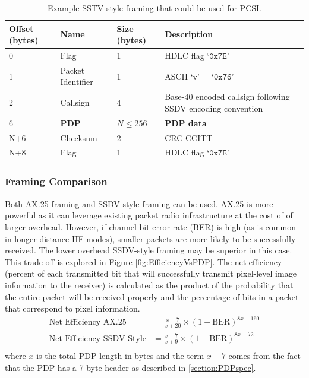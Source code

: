 \documentclass[letterpaper]{article}
\begin{document}
\begin{table}[tbp]
    \centering
\begin{tabularx}{\textwidth}{ |l|l|l|X| } 
 \hline
 \textbf{Offset (bytes)} & \textbf{Name} & \textbf{Size (bytes)} & \textbf{Description} \\ \hline\hline
 0 & Flag & 1 & HDLC flag `$\mathtt{0x7E}$' \\ \hline
 1 & Packet Identifier & 1 & ASCII `v' = `$\mathtt{0x76}$' \\ \hline
 2 & Callsign & 4 & Base-40 encoded callsign following SSDV encoding convention \\ \hline
 6 & \textbf{PDP} & $N \leq 256$ & \textbf{PDP data} \\ \hline
 N+6 & Checksum & 2 & CRC-CCITT\\ \hline
 N+8 & Flag & 1 & HDLC flag `$\mathtt{0x7E}$' \\
 \hline
\end{tabularx}
\caption{Example SSTV-style framing that could be used for PCSI.}
\label{table:SSDVframing}
\end{table}



\subsubsection{Framing Comparison}
Both AX.25 framing and SSDV-style framing can be used. AX.25 is more powerful as it can leverage existing packet radio infrastructure at the cost of of larger overhead. However, if channel bit error rate (BER) is high (as is common in longer-distance HF modes), smaller packets are more likely to be successfully received. The lower overhead SSDV-style framing may be superior in this case. This trade-off is explored in Figure \ref{fig:EfficiencyVsPDP}. The net efficiency (percent of each transmitted bit that will successfully transmit pixel-level image information to the receiver)  is calculated as the product of the probability that the entire packet will be received properly and the percentage of bits in a packet that correspond to pixel information.
\begin{align}
    \text{Net Efficiency AX.25} &= \frac{x-7}{x+20}\times(1-\text{BER})^{8x+160}\\
    \text{Net Efficiency SSDV-Style} &= \frac{x-7}{x+9}\times(1-\text{BER})^{8x+72}\\
\end{align}
where $x$ is the total PDP length in bytes and the term $x-7$ comes from the fact that the PDP has a 7 byte header as described in \ref{section:PDPspec}.
\end{document}
